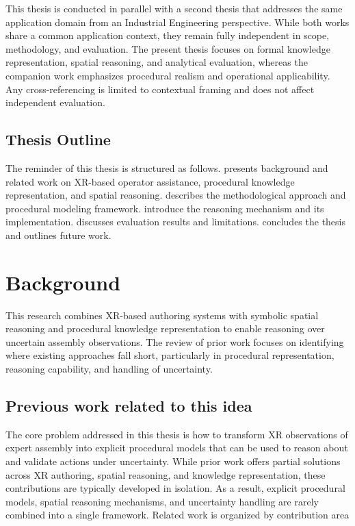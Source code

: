 \documentclass[11pt,titlepage,openright]{book}
\begin{document}
This thesis is conducted in parallel with a second thesis that addresses the same application domain from an Industrial Engineering perspective. While both works share a common application context, they remain fully independent in scope, methodology, and evaluation. The present thesis focuses on formal knowledge representation, spatial reasoning, and analytical evaluation, whereas the companion work emphasizes procedural realism and operational applicability. Any cross-referencing is limited to contextual framing and does not affect independent evaluation.


\section{Thesis Outline}
\label{sec:thesis-outline}

The reminder of this thesis is structured as follows.  presents background and related work on XR-based operator assistance, procedural knowledge representation, and spatial reasoning.  describes the methodological approach and procedural modeling framework.  introduce the reasoning mechanism and its implementation.  discusses evaluation results and limitations.  concludes the thesis and outlines future work.


\chapter{Background}
\label{cha:background}

This research combines XR-based authoring systems with symbolic spatial reasoning and procedural knowledge representation to enable reasoning over uncertain assembly observations. The review of prior work focuses on identifying where existing approaches fall short, particularly in procedural representation, reasoning capability, and handling of uncertainty.

\section{Previous work related to this idea}
\label{sec:previous-work-related}

The core problem addressed in this thesis is how to transform XR observations of expert assembly into explicit procedural models that can be used to reason about and validate actions under uncertainty. While prior work offers partial solutions across XR authoring, spatial reasoning, and knowledge representation, these contributions are typically developed in isolation. As a result, explicit procedural models, spatial reasoning mechanisms, and uncertainty handling are rarely combined into a single framework.
Related work is organized by contribution area
\end{document}
